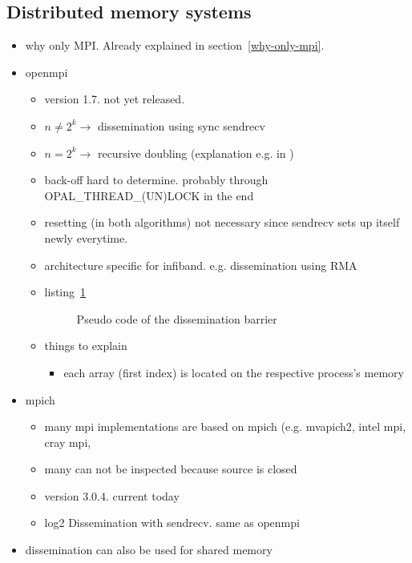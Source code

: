 \documentclass[a4paper, 10pt]{article}
\begin{document}
\subsection{Distributed memory systems}
\begin{itemize}
	\item why only MPI. Already explained in section~\ref{why-only-mpi}.
	\item openmpi
		\begin{itemize}
			\item version 1.7. not yet released.
			\item $n \neq 2^k \rightarrow$ dissemination\cite{hensgen1988} using sync sendrecv
			\item $n = 2^k \rightarrow$ recursive doubling (explanation e.g. in \cite{hoefler2005})
			\item back-off hard to determine. probably through OPAL\_THREAD\_(UN)LOCK in the end
			\item resetting (in both algorithms) not necessary since sendrecv sets up itself newly everytime.
			\item architecture specific for infiband. e.g. dissemination using RMA \cite{hoefler2006a}
			\item listing~\ref{listing:dissemination-no-reset}
				\begin{figure}[htbp]
					\centering
					
					\caption{Pseudo code of the dissemination barrier}
					\label{listing:dissemination-no-reset}
				\end{figure}
			\item things to explain
				\begin{itemize}
					\item each array (first index) is located on the respective process's memory
				\end{itemize}

		\end{itemize}
	\item mpich
		\begin{itemize}
			\item many mpi implementations are based on mpich (e.g. mvapich2, intel mpi, cray mpi,
			\item many can not be inspected because source is closed
			\item version 3.0.4. current today
			\item log2 Dissemination with sendrecv. same as openmpi
		\end{itemize}
	\item dissemination can also be used for shared memory\cite{hoefler2013}
\end{itemize}
\end{document}
